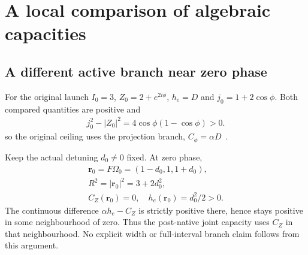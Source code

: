 \section{A local comparison of algebraic capacities}\label{sec:capacity}
\subsection{A different active branch near zero phase}\label{sec:branch}
For the original launch $I_0=3$, $Z_0=2+e^{2i\phi}$, $h_e=D$ and $j_0=1+2\cos\phi$. Both compared quantities are positive and
\begin{equation}\label{eq:a45}%
\begin{gathered}
j_0^2-|Z_0|^2=4\cos\phi(1-\cos\phi)>0.
\end{gathered}
\end{equation}
so the original ceiling uses the projection branch, $C_\phi=\alpha D$~\cite[Section 3, strict yaw witness]{pc}.

Keep the actual detuning $d_0\ne0$ fixed. At zero phase,
\begin{equation}\label{eq:a46}%
\begin{gathered}
\mathbf r_0=F\Omega_0=(1-d_0,1,1+d_0),\\ R^2=|\mathbf r_0|^2=3+2d_0^2,\\ C_Z(\mathbf r_0)=0,\quad h_e(\mathbf r_0)=d_0^2/2>0.
\end{gathered}
\end{equation}
The continuous difference $\alpha h_e-C_Z$ is strictly positive there, hence stays positive in some neighbourhood of zero. Thus the post-native joint capacity uses $C_Z$ in that neighbourhood. No explicit width or full-interval branch claim follows from this argument.

